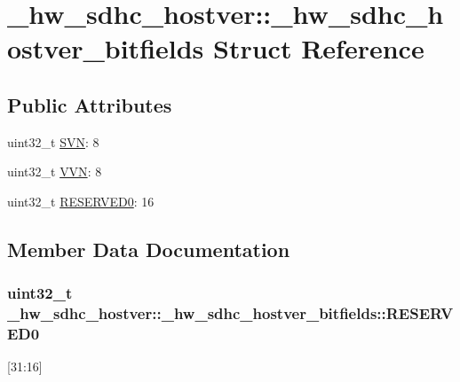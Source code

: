 \hypertarget{struct__hw__sdhc__hostver_1_1__hw__sdhc__hostver__bitfields}{}\section{\+\_\+hw\+\_\+sdhc\+\_\+hostver\+:\+:\+\_\+hw\+\_\+sdhc\+\_\+hostver\+\_\+bitfields Struct Reference}
\label{struct__hw__sdhc__hostver_1_1__hw__sdhc__hostver__bitfields}
\subsection*{Public Attributes}
\begin{DoxyCompactItemize}
\item 
uint32\+\_\+t \hyperlink{struct__hw__sdhc__hostver_1_1__hw__sdhc__hostver__bitfields_a3f4c8ae2c696ad186ad0394b914e500f}{S\+VN}\+: 8
\item 
uint32\+\_\+t \hyperlink{struct__hw__sdhc__hostver_1_1__hw__sdhc__hostver__bitfields_a05d4ebc89a47546d0fe9148888961d2e}{V\+VN}\+: 8
\item 
uint32\+\_\+t \hyperlink{struct__hw__sdhc__hostver_1_1__hw__sdhc__hostver__bitfields_ab4dd041d98f8f5f9567fed601ae957a5}{R\+E\+S\+E\+R\+V\+E\+D0}\+: 16
\end{DoxyCompactItemize}


\subsection{Member Data Documentation}
\subsubsection[{\texorpdfstring{R\+E\+S\+E\+R\+V\+E\+D0}{RESERVED0}}]{\setlength{\rightskip}{0pt plus 5cm}uint32\+\_\+t \+\_\+hw\+\_\+sdhc\+\_\+hostver\+::\+\_\+hw\+\_\+sdhc\+\_\+hostver\+\_\+bitfields\+::\+R\+E\+S\+E\+R\+V\+E\+D0}\hypertarget{struct__hw__sdhc__hostver_1_1__hw__sdhc__hostver__bitfields_ab4dd041d98f8f5f9567fed601ae957a5}{}\label{struct__hw__sdhc__hostver_1_1__hw__sdhc__hostver__bitfields_ab4dd041d98f8f5f9567fed601ae957a5}
\mbox{[}31\+:16\mbox{]} 
